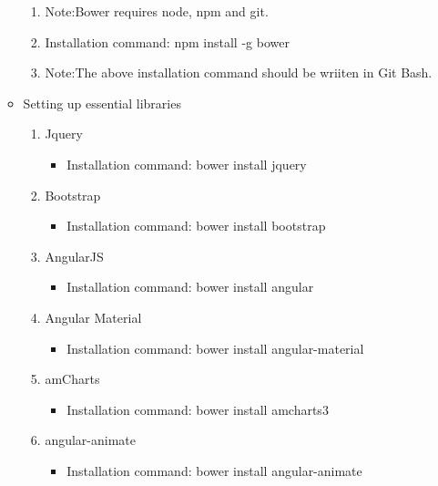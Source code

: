 \documentclass[a4paper,12pt,oneside]{book}
\begin{document}
\begin{enumerate}
\begin{itemize}
\begin{enumerate}
                \item{Note:Bower requires node, npm and git.}
                \item {Installation command: npm install -g bower}
                \item{Note:The above installation command should be wriiten in Git Bash.}
            \end{enumerate}
        \item{Setting up essential libraries}
            \begin{enumerate}
                    \item{Jquery}
                        \begin{itemize}
                            \item{Installation command: bower install jquery}
                        \end{itemize}
                    \item{Bootstrap}
                        \begin{itemize}
                            \item{Installation command: bower install bootstrap}
                        \end{itemize}
                    \item{AngularJS}
                        \begin{itemize}
                            \item{Installation command: bower install angular}
                        \end{itemize}
                    \item{Angular Material}
                        \begin{itemize}
                            \item{Installation command: bower install angular-material}
                        \end{itemize}
                    \item{amCharts}
                        \begin{itemize}
                            \item{Installation command: bower install amcharts3}
                        \end{itemize}
                    \item{angular-animate}
                        \begin{itemize}
                            \item{Installation command: bower install angular-animate}

\end{itemize}
\end{enumerate}
\end{itemize}
\end{enumerate}
\end{document}
